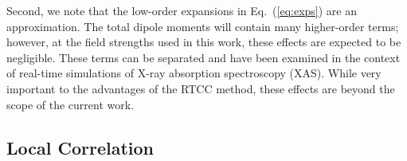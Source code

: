 
Second, we note that the low-order expansions in Eq.~(\ref{eq:exps}) are
an approximation. The total dipole moments will contain many higher-order
terms; however, at the field strengths used in this work, these effects
are expected to be negligible. These terms can be separated and have been
examined in the context of real-time simulations of X-ray absorption 
spectroscopy (XAS).\cite{Park2021b}
While very important to the advantages of the RTCC method, these effects
are beyond the scope of the current work.

\subsection{Local Correlation} \label{ss:local}
